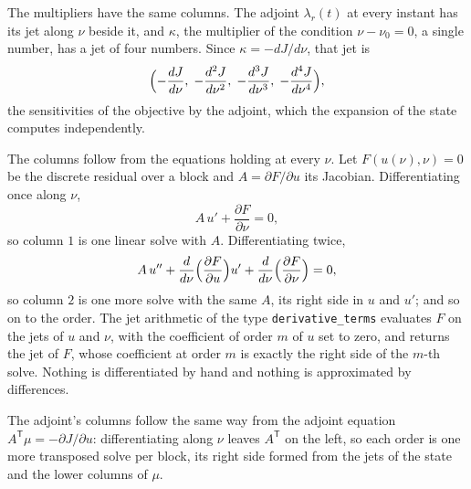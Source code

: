The multipliers have the same columns. The adjoint $\lambda_r(t)$ at
every instant has its jet along $\nu$ beside it, and $\kappa$, the
multiplier of the condition $\nu - \nu_0 = 0$, a single number, has a
jet of four numbers. Since $\kappa = -dJ/d\nu$, that jet is
\[
  \Bigl( -\frac{dJ}{d\nu},\; -\frac{d^2J}{d\nu^2},\;
         -\frac{d^3J}{d\nu^3},\; -\frac{d^4J}{d\nu^4} \Bigr),
\]
the sensitivities of the objective by the adjoint, which the expansion
of the state computes independently.

The columns follow from the equations holding at every $\nu$. Let
$F(u(\nu), \nu) = 0$ be the discrete residual over a block and
$A = \partial F / \partial u$ its Jacobian. Differentiating once along
$\nu$,
\[
  A\, u' + \frac{\partial F}{\partial \nu} = 0,
\]
so column $1$ is one linear solve with $A$. Differentiating twice,
\[
  A\, u'' + \frac{d}{d\nu}\Bigl(\frac{\partial F}{\partial u}\Bigr) u'
          + \frac{d}{d\nu}\Bigl(\frac{\partial F}{\partial \nu}\Bigr) = 0,
\]
so column $2$ is one more solve with the same $A$, its right side in
$u$ and $u'$; and so on to the order. The jet arithmetic of the type
\texttt{derivative\_terms} evaluates $F$ on the jets of $u$ and $\nu$,
with the coefficient of order $m$ of $u$ set to zero, and returns the
jet of $F$, whose coefficient at order $m$ is exactly the right side of
the $m$-th solve. Nothing is differentiated by hand and nothing is
approximated by differences.

The adjoint's columns follow the same way from the adjoint equation
$A^{\mathsf T} \mu = -\partial J / \partial u$: differentiating along
$\nu$ leaves $A^{\mathsf T}$ on the left, so each order is one more
transposed solve per block, its right side formed from the jets of the
state and the lower columns of $\mu$.
